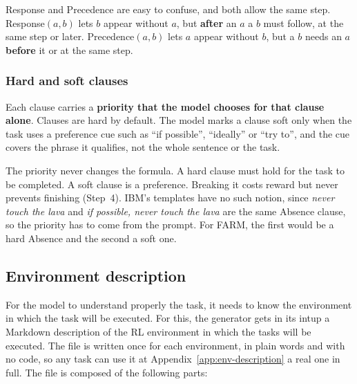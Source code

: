 \documentclass[11pt,english,listoffigures,listoftables]{tfgetsinf}
\begin{document}
Response and Precedence are easy to confuse, and both allow the same step. Response$(a,b)$ lets $b$ appear without $a$, but \textbf{after} an $a$ a $b$ must follow, at the same step or later. Precedence$(a,b)$ lets $a$ appear without $b$, but a $b$ needs an $a$ \textbf{before} it or at the same step.



\subsubsection{Hard and soft clauses}
Each clause carries a \textbf{priority that the model chooses for that clause alone}. Clauses are hard by default. The model marks a clause soft only when the task uses a preference cue such as ``if possible'', ``ideally'' or ``try to'', and the cue covers the phrase it qualifies, not the whole sentence or the task. 

The priority never changes the formula. A hard clause must hold for the task to be completed. A soft clause is a preference. Breaking it costs reward but never prevents finishing (Step~4). IBM's templates have no such notion, since \textit{never touch the lava} and \textit{if possible, never touch the lava} are the same Absence clause, so the priority has to come from the prompt. For FARM, the first would be a hard Absence and the second a soft one.



\subsection{Environment description} 
For the model to understand properly the task, it needs to know the environment in which the task will be executed. For this, the generator gets in its intup a Markdown description of the RL environment in which the tasks will be executed. The file is written once for each environment, in plain words and with no code, so any task can use it at Appendix~\ref{app:env-description} a real one in full. The file is composed of the following parts:
\end{document}
